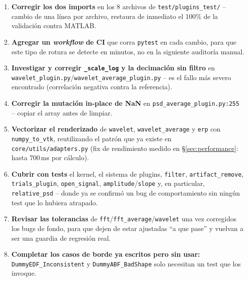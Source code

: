 \documentclass[11pt,a4paper]{article}
\begin{document}
\begin{enumerate}
  \item \textbf{Corregir los dos imports} en los 8 archivos de \texttt{test/plugins\_\allowbreak test/} -- cambio de una
        línea por archivo, restaura de inmediato el 100\% de la validación contra MATLAB.
  \item \textbf{Agregar un \textit{workflow} de CI} que corra \texttt{pytest} en cada cambio, para que este
        tipo de rotura se detecte en minutos, no en la siguiente auditoría manual.
  \item \textbf{Investigar y corregir \texttt{\_\allowbreak scale\_\allowbreak log} y la decimación sin filtro} en
        \texttt{wavelet\_\allowbreak plugin.py}/\texttt{wavelet\_\allowbreak average\_\allowbreak plugin.py} -- es el fallo más severo
        encontrado (correlación negativa contra la referencia).
  \item \textbf{Corregir la mutación in-place de NaN} en \texttt{psd\_\allowbreak average\_\allowbreak plugin.py:255} -- copiar el
        array antes de limpiar.
  \item \textbf{Vectorizar el renderizado} de \texttt{wavelet}, \texttt{wavelet\_\allowbreak average} y \texttt{erp} con
        \texttt{numpy\_\allowbreak to\_\allowbreak vtk}, reutilizando el patrón que ya existe en \texttt{core/utils/adapters.py}
        (fix de rendimiento medido en \S\ref{sec:performance}: hasta 700\,ms por cálculo).
  \item \textbf{Cubrir con tests} el kernel, el sistema de plugins, \texttt{filter}, \texttt{artifact\_\allowbreak remove},
        \texttt{trials\_\allowbreak plugin}, \texttt{open\_\allowbreak signal}, \texttt{amplitude}/\texttt{slope} y, en particular,
        \texttt{relative\_\allowbreak psd} -- donde ya se confirmó un bug de comportamiento sin ningún test que lo
        hubiera atrapado.
  \item \textbf{Revisar las tolerancias} de \texttt{fft}/\texttt{fft\_\allowbreak average}/\texttt{wavelet} una vez
        corregidos los bugs de fondo, para que dejen de estar ajustadas ``a que pase'' y vuelvan a ser una
        guardia de regresión real.
  \item \textbf{Completar los casos de borde ya escritos pero sin usar:} \texttt{DummyEDF\_\allowbreak Inconsistent} y
        \texttt{DummyABF\_\allowbreak BadShape} solo necesitan un test que los invoque.
\end{enumerate}

\end{document}
